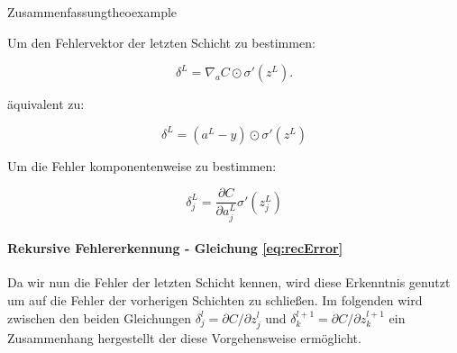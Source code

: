  
\begin{mytheo}{Zusammenfassung}{theoexample}


Um den Fehlervektor der letzten Schicht zu bestimmen: 

\begin{equation}
\delta^L = \nabla_a C \odot \sigma'(z^L).
\end{equation}


äquivalent zu: 

\begin{equation}
\delta^L = (a^L-y) \odot \sigma'(z^L)
\end{equation}


Um die Fehler komponentenweise zu bestimmen: 

\begin{equation}
\delta^L_j = \frac{\partial C}{\partial a^L_j} \sigma'(z^L_j)
\end{equation}

\end{mytheo}






\paragraph{Rekursive Fehlererkennung - Gleichung \ref{eq:recError}}

Da wir nun die Fehler der letzten Schicht kennen, wird diese Erkenntnis genutzt um auf die Fehler der vorherigen Schichten zu schließen. Im folgenden wird zwischen den beiden Gleichungen $\delta^l_j = \partial C / \partial z^l_j$ und $\delta^{l+1}_k = \partial C / \partial z^{l+1}_k$ ein Zusammenhang hergestellt der diese Vorgehensweise ermöglicht.

